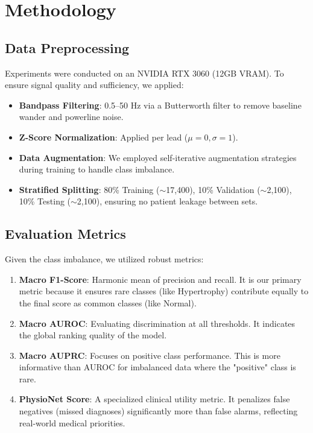 \documentclass[conference]{IEEEtran}
\begin{document}
\section{Methodology}

\subsection{Data Preprocessing}
Experiments were conducted on an NVIDIA RTX 3060 (12GB VRAM). To ensure signal quality and sufficiency, we applied:
\begin{itemize}
    \item \textbf{Bandpass Filtering}: 0.5--50 Hz via a Butterworth filter to remove baseline wander and powerline noise.
    \item \textbf{Z-Score Normalization}: Applied per lead ($\mu=0, \sigma=1$).
    \item \textbf{Data Augmentation}: We employed self-iterative augmentation strategies \cite{jiang2025generation} during training to handle class imbalance.
    \item \textbf{Stratified Splitting}: 80\% Training ($\sim$17,400), 10\% Validation ($\sim$2,100), 10\% Testing ($\sim$2,100), ensuring no patient leakage between sets.
\end{itemize}

\subsection{Evaluation Metrics}
Given the class imbalance, we utilized robust metrics:
\begin{enumerate}
    \item \textbf{Macro F1-Score}: Harmonic mean of precision and recall. It is our primary metric because it ensures rare classes (like Hypertrophy) contribute equally to the final score as common classes (like Normal).
    \item \textbf{Macro AUROC}: Evaluating discrimination at all thresholds. It indicates the global ranking quality of the model.
    \item \textbf{Macro AUPRC}: Focuses on positive class performance. This is more informative than AUROC for imbalanced data where the "positive" class is rare.
    \item \textbf{PhysioNet Score}: A specialized clinical utility metric. It penalizes false negatives (missed diagnoses) significantly more than false alarms, reflecting real-world medical priorities.
\end{enumerate}
\end{document}
